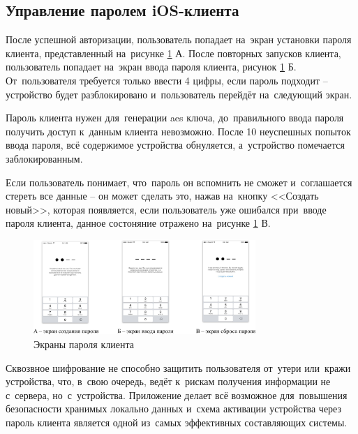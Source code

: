 \subsection{Управление паролем iOS-клиента}
\label{sec:usage:pin}

После успешной авторизации, пользователь попадает на~экран установки пароля клиента, представленный на~рисунке \ref{sec:usage:pin:ui} А. После повторных запусков клиента, пользователь попадает на~экран ввода пароля клиента, рисунок \ref{sec:usage:pin:ui} Б. От~пользователя требуется только ввести 4 цифры, если пароль подходит -- устройство будет разблокировано и~пользователь перейдёт на~следующий экран.

Пароль клиента нужен для~генерации \gls{aes} ключа, до~правильного ввода пароля получить доступ к~данным клиента невозможно. После 10 неуспешных попыток ввода пароля, всё содержимое устройства обнуляется, а~устройство помечается заблокированным.

Если пользователь понимает, что~пароль он вспомнить не сможет и~соглашается стереть все данные -- он может сделать это, нажав на~кнопку <<Создать новый>>, которая появляется, если пользователь уже ошибался при~вводе пароля клиента, данное состоняние отражено на~рисунке \ref{sec:usage:pin:ui} В.

\begin{figure}[h]
  \centering
    \includegraphics[width=0.75\textwidth]{inc/img/ui/pin_combined.jpg}
  \caption{Экраны пароля клиента}
  \label{sec:usage:pin:ui}
\end{figure}

Сквозвное шифрование не способно защитить пользователя от~утери или~кражи устройства, что, в~свою очередь, ведёт к~рискам получения информации не с~сервера, но~с~устройства. Приложение делает всё возможное для~повышения безопасности хранимых локально данных и~схема активации устройства через пароль клиента является одной из~самых эффективных составляющих системы.